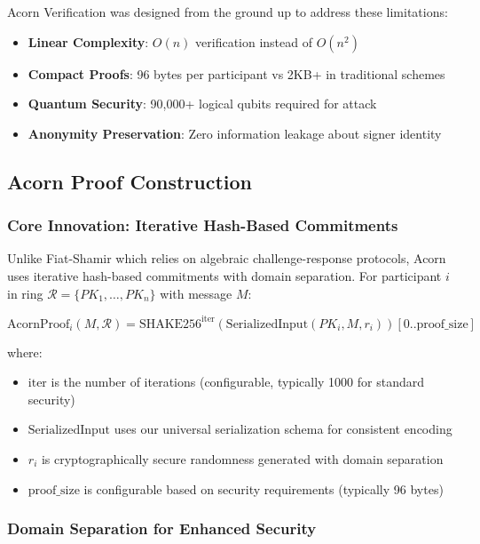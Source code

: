 \documentclass[11pt,a4paper]{article}
\begin{document}
Acorn Verification was designed from the ground up to address these limitations:

\begin{itemize}
\item \textbf{Linear Complexity}: $O(n)$ verification instead of $O(n^2)$
\item \textbf{Compact Proofs}: 96 bytes per participant vs 2KB+ in traditional schemes
\item \textbf{Quantum Security}: 90,000+ logical qubits required for attack
\item \textbf{Anonymity Preservation}: Zero information leakage about signer identity
\end{itemize}

\subsection{Acorn Proof Construction}

\subsubsection{Core Innovation: Iterative Hash-Based Commitments}

Unlike Fiat-Shamir which relies on algebraic challenge-response protocols, Acorn uses iterative hash-based commitments with domain separation. For participant $i$ in ring $\mathcal{R} = \{PK_1, \ldots, PK_n\}$ with message $M$:

\begin{equation}
\text{AcornProof}_i(M, \mathcal{R}) = \text{SHAKE256}^{\text{iter}}(\text{SerializedInput}(PK_i, M, r_i))[0..\text{proof\_size}]
\end{equation}

where:
\begin{itemize}
\item $\text{iter}$ is the number of iterations (configurable, typically 1000 for standard security)
\item $\text{SerializedInput}$ uses our universal serialization schema for consistent encoding
\item $r_i$ is cryptographically secure randomness generated with domain separation
\item $\text{proof\_size}$ is configurable based on security requirements (typically 96 bytes)
\end{itemize}

\subsubsection{Domain Separation for Enhanced Security}
\end{document}
